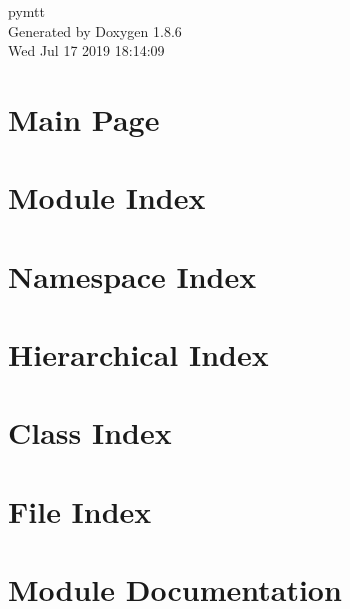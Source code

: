 \documentclass[twoside]{book}
\newcommand{\clearemptydoublepage}{%
  \newpage{\pagestyle{empty}\cleardoublepage}%
}
\begin{document}
\hypersetup{pageanchor=false}
\begin{titlepage}
\vspace*{7cm}
\begin{center}%
{\Large pymtt }\\
\vspace*{1cm}
{\large Generated by Doxygen 1.8.6}\\
\vspace*{0.5cm}
{\small Wed Jul 17 2019 18:14:09}\\
\end{center}
\end{titlepage}
\clearemptydoublepage
\tableofcontents
\clearemptydoublepage
{}
\hypersetup{pageanchor=true}

\chapter{Main Page}
\label{index}\hypertarget{index}{}
\chapter{Module Index}

\chapter{Namespace Index}

\chapter{Hierarchical Index}

\chapter{Class Index}

\chapter{File Index}

\chapter{Module Documentation}






















\end{document}
